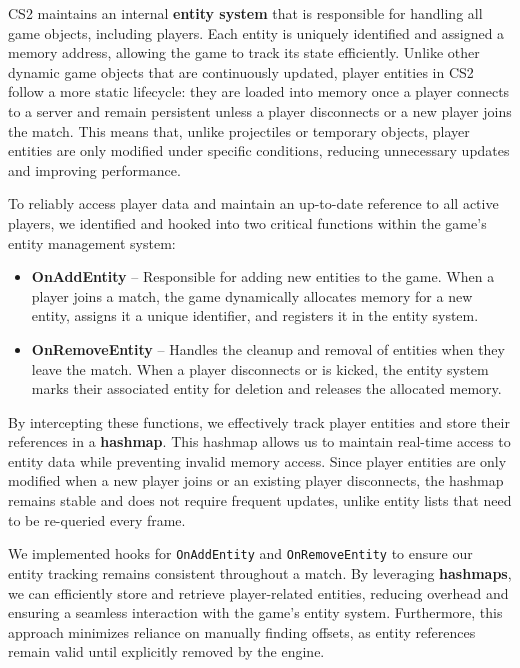 CS2 maintains an internal \textbf{entity system} that is responsible for handling all game objects, including players. Each entity is uniquely identified and assigned a memory address, allowing the game to track its state efficiently. Unlike other dynamic game objects that are continuously updated, player entities in CS2 follow a more static lifecycle: they are loaded into memory once a player connects to a server and remain persistent unless a player disconnects or a new player joins the match. This means that, unlike projectiles or temporary objects, player entities are only modified under specific conditions, reducing unnecessary updates and improving performance.

To reliably access player data and maintain an up-to-date reference to all active players, we identified and hooked into two critical functions within the game's entity management system:

\begin{itemize}
    \item \textbf{OnAddEntity} – Responsible for adding new entities to the game. When a player joins a match, the game dynamically allocates memory for a new entity, assigns it a unique identifier, and registers it in the entity system.
    \item \textbf{OnRemoveEntity} – Handles the cleanup and removal of entities when they leave the match. When a player disconnects or is kicked, the entity system marks their associated entity for deletion and releases the allocated memory.
\end{itemize}

By intercepting these functions, we effectively track player entities and store their references in a \textbf{hashmap}. This hashmap allows us to maintain real-time access to entity data while preventing invalid memory access. Since player entities are only modified when a new player joins or an existing player disconnects, the hashmap remains stable and does not require frequent updates, unlike entity lists that need to be re-queried every frame.

We implemented hooks for \texttt{OnAddEntity} and \texttt{OnRemoveEntity} to ensure our entity tracking remains consistent throughout a match. By leveraging \textbf{hashmaps}, we can efficiently store and retrieve player-related entities, reducing overhead and ensuring a seamless interaction with the game's entity system. Furthermore, this approach minimizes reliance on manually finding offsets, as entity references remain valid until explicitly removed by the engine.



